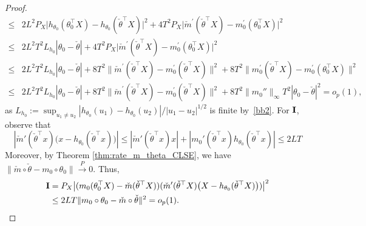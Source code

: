 {\begin{proof}
{\begin{align*}
   \le{}&  2 L^2 P_X \Big| h_{\theta_0}(\theta_0 ^\top X) -  h_{\theta_0}(\check{\theta} ^\top X)\Big|^2+ 4 T^2P_X \Big|\check{m}^\prime(\check{\theta} ^\top X)  -m_0^\prime(\theta_0^\top X)\Big|^2\\
\le{}&  2 L^2 T^2 L_{h_0} |\theta_0 -\check{\theta}|+ 4 T^2P_X \Big|\check{m}^\prime(\check{\theta} ^\top X)  -m_0^\prime(\theta_0^\top X)\Big|^2\\
% 
\le{}&  2 L^2 T^2 L_{h_0} |\theta_0 -\check{\theta}|+ 8 T^2 \|\check{m}^\prime(\check{\theta} ^\top X)  -m_0^\prime(\check{\theta}^\top X)\|^2 +  8 T^2 \|m_0^\prime(\check{\theta}^\top X)  -m_0^\prime(\theta_0^\top X)\|^2\\
% 
\le{}&  { 2 L^2 T^2 L_{h_0} |\theta_0 -\check{\theta}|+ 8 T^2 \|\check{m}^\prime(\check{\theta} ^\top X)  -m_0^\prime(\check{\theta}^\top X)\|^2 +  8 T^2 \|m_0''\|_{\infty} T^2 |\theta_0-\check{\theta}|^2
= o_p(1),}
\end{align*}}
{ as $L_{h_0} := \sup_{u_1\neq u_2}| h_{\theta_0}(u_1)- h_{\theta_0}(u_2)|/|u_1-u_2|^{1/2}$ is finite by~\ref{bb2}.} For $\textbf{\Rome{1}}$, observe that
\begin{equation}\label{eq:bound_1_second}
|\check{m}'(\check{\theta}^{\top}x)\big(x - h_{\theta_0}(\check{\theta}^{\top}x)\big)| \le |\check{m}'(\check{\theta}^{\top}x)x| + |m_0'(\check{\theta}^{\top}x)h_{\theta_0}(\check{\theta}^{\top}x)| \le 2LT
\end{equation}
Moreover, by Theorem \ref{thm:rate_m_theta_CLSE}, we have $\|\check{m}\circ\check{\theta} - m_0\circ\theta_0\| \stackrel {P}{\rightarrow} 0$. Thus,
\begin{align*}
\textbf{\Rome{1}}={}& P_X \big|( m_0(\theta_0^\top X)-\check{m}(\check{\theta}^\top X)) (\check{m}^\prime(\check{\theta} ^\top X) \big(X -  h_{\theta_0}(\check{\theta} ^\top X)\big))\big|^2\\
\leq{}&2 LT\|m_0\circ\theta_0 - \check{m}\circ\check{\theta}\|^2=o_p(1).
\end{align*}

\end{proof}}
